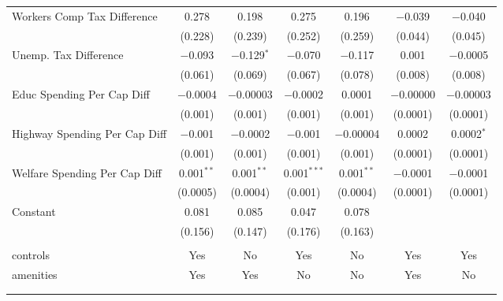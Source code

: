 \begin{table}[!htbp]
\begin{tabular}{@{\extracolsep{5pt}}lcccccc}
  Workers Comp Tax Difference & 0.278 & 0.198 & 0.275 & 0.196 & $-$0.039 & $-$0.040 \\ 
  & (0.228) & (0.239) & (0.252) & (0.259) & (0.044) & (0.045) \\ 
  Unemp. Tax Difference & $-$0.093 & $-$0.129$^{*}$ & $-$0.070 & $-$0.117 & 0.001 & $-$0.0005 \\ 
  & (0.061) & (0.069) & (0.067) & (0.078) & (0.008) & (0.008) \\ 
  Educ Spending Per Cap Diff & $-$0.0004 & $-$0.00003 & $-$0.0002 & 0.0001 & $-$0.00000 & $-$0.00003 \\ 
  & (0.001) & (0.001) & (0.001) & (0.001) & (0.0001) & (0.0001) \\ 
  Highway Spending Per Cap Diff & $-$0.001 & $-$0.0002 & $-$0.001 & $-$0.00004 & 0.0002 & 0.0002$^{*}$ \\ 
  & (0.001) & (0.001) & (0.001) & (0.001) & (0.0001) & (0.0001) \\ 
  Welfare Spending Per Cap Diff & 0.001$^{**}$ & 0.001$^{**}$ & 0.001$^{***}$ & 0.001$^{**}$ & $-$0.0001 & $-$0.0001 \\ 
  & (0.0005) & (0.0004) & (0.001) & (0.0004) & (0.0001) & (0.0001) \\ 
  Constant & 0.081 & 0.085 & 0.047 & 0.078 &  &  \\ 
  & (0.156) & (0.147) & (0.176) & (0.163) &  &  \\ 
 \hline \\[-1.8ex] 
controls & Yes & No & Yes & No & Yes & Yes \\ 
amenities & Yes & Yes & No & No & Yes & No \\ 
\hline \\[-1.8ex] 
\hline 
\hline \\[-1.8ex] 
\end{tabular} 
\end{table} 
